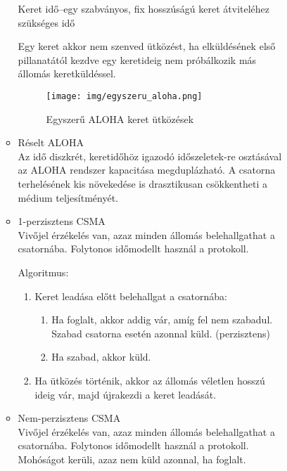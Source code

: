 \documentclass[margin=0px]{article}
\begin{document}
\begin{description}
\begin{description}
\begin{itemize}
\begin{itemize}
                                    Keret idő–egy szabványos, fix hosszúságú keret átviteléhez szükséges idő

                                    Egy keret akkor nem szenved ütközést, ha elküldésének első pillanatától kezdve egy keretideig nem próbálkozik más állomás keretküldéssel.

                                    \begin{figure}[H]
                                        \centering
                                        \texttt{[image: img/egyszeru\_aloha.png]}
                                        \caption{Egyszerű ALOHA keret ütközések}
                                    \end{figure}
                              \item Réselt ALOHA \\
                                    Az idő diszkrét, keretidőhöz igazodó időszeletek-re osztásával az ALOHA rendszer kapacitása megduplázható. A csatorna terhelésének kis növekedése is drasztikusan csökkentheti a médium teljesítményét.
                              \item 1-perzisztens CSMA \\
                                    Vivőjel érzékelés van, azaz minden állomás belehallgathat a csatornába. Folytonos időmodellt használ a protokoll.

                                    Algoritmus:
                                    \begin{enumerate}
                                        \item Keret leadása előtt belehallgat a csatornába:
                                              \begin{enumerate}
                                                  \item Ha foglalt, akkor addig vár, amíg fel nem szabadul. Szabad csatorna esetén azonnal küld. (perzisztens)
                                                  \item Ha szabad, akkor küld.
                                              \end{enumerate}
                                        \item Ha ütközés történik, akkor az állomás véletlen hosszú ideig vár, majd újrakezdi a keret leadását.
                                    \end{enumerate}
                              \item Nem-perzisztens CSMA \\
                                    Vivőjel érzékelés van, azaz minden állomás belehallgathat a csatornába. Folytonos időmodellt használ a protokoll. Mohóságot kerüli, azaz nem küld azonnal, ha foglalt.


\end{itemize}
\end{itemize}
\end{description}
\end{description}
\end{document}
